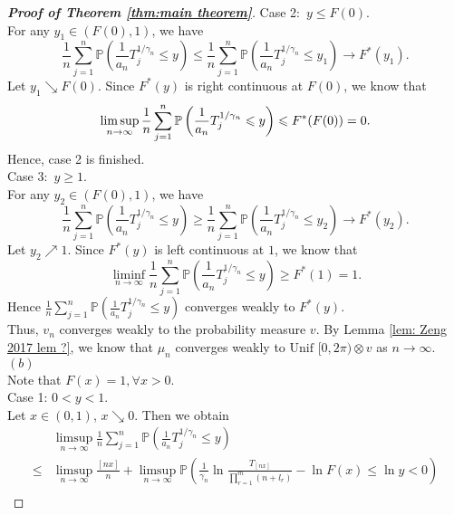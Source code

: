 \documentclass[12pt]{article}
\theoremstyle{plain}
\theoremstyle{definition}
\theoremstyle{remark}
\begin{document}
\begin{proof}[\textit{\textbf{Proof of Theorem \ref{thm:main theorem}}}]
Case 2:\ $y\leq F(0)$.\\
For any $y_1 \in (F(0),1)$, we have 
\begin{equation*}
\frac{1}{n} \sum_{j=1}^{n} \mathbb{P}\left(\frac{1}{a_{n}} T_{j}^{1 / \gamma_{n}} \leqslant y\right)\leq \frac{1}{n} \sum_{j=1}^{n} \mathbb{P}\left(\frac{1}{a_{n}} T_{j}^{1 / \gamma_{n}} \leqslant y_1\right)\to F^*(y_1).
\end{equation*}
Let $y_1\searrow  F(0)$. Since $F^*(y)$ is right continuous at $F(0)$, we know that 
\begin{equation*}
\limsup_{n\rightarrow \infty}\frac{1}{n} \sum_{j=1}^{n} \mathbb{P}\left(\frac{1}{a_{n}} T_{j}^{1 / \gamma_{n}} \leqslant y\right)\leq F^*(F(0))=0.\\
\end{equation*}
Hence, case 2 is finished.\\
Case 3:\ $y\geq 1$.\\
For any $y_2 \in (F(0),1)$, we have 
\begin{equation*}
	\frac{1}{n} \sum_{j=1}^{n} \mathbb{P}\left(\frac{1}{a_{n}} T_{j}^{1 / \gamma_{n}} \leqslant y\right)\geq \frac{1}{n} \sum_{j=1}^{n} \mathbb{P}\left(\frac{1}{a_{n}} T_{j}^{1 / \gamma_{n}} \leqslant y_2\right)\to F^*(y_2).
\end{equation*}
Let $y_2\nearrow  1$. Since $F^*(y)$ is left continuous at $1$, we know that 
\begin{equation*}
	\liminf_{n\rightarrow\infty}\frac{1}{n} \sum_{j=1}^{n} \mathbb{P}\left(\frac{1}{a_{n}} T_{j}^{1 / \gamma_{n}} \leqslant y\right)\geq F^*(1)=1.
\end{equation*}
Hence $\frac{1}{n} \sum_{j=1}^{n} \mathbb{P}\left(\frac{1}{a_{n}} T_{j}^{1 / \gamma_{n}} \leq y\right)$ converges weakly to $F^*(y)$.\\
Thus, $v_{n}$ converges weakly to the probability measure $v$.
By Lemma \ref{lem: Zeng 2017   lem ?}, we know that $\mu_{n}$ converges weakly to$\text { Unif }[0,2 \pi) \otimes v$ as $n\to \infty$.\\
$(b)$\\
Note that $F(x)=1,\forall x>0$.\\
Case 1: $0<y<1$.\\
Let $x\in (0,1)$, $x\searrow0$. Then we obtain 
\begin{equation*}
\begin{aligned} & \limsup _{n \rightarrow \infty} \frac{1}{n} \sum_{j=1}^{n} \mathbb{P}\left(\frac{1}{a_{n}} T_{j}^{1 / \gamma_{n}} \leqslant y\right) \\ \leqslant & \limsup _{n \rightarrow \infty} \frac{[n x]}{n}+\limsup _{n \rightarrow \infty} \mathbb{P}\left(\frac{1}{\gamma_{n}} \ln \frac{T_{[n x]}}{\prod_{r=1}^{m}\left(n+l_{r}\right)}-\ln F(x) \leqslant \ln y<0\right) \\

\end{aligned}
\end{equation*}
\end{proof}
\end{document}
